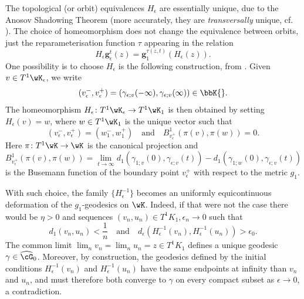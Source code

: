 \documentclass[reqno,11pt]{amsart}
\begin{document}
    \begin{remark}\label{rem:anosov_top_equivalences}
        The topological (or orbit) equivalences \(H_{\epsilon}\) are essentially unique, due to the Anosov Shadowing Theorem (more accurately, they are \emph{transversally} unique, cf. \cite[Theorem 5.4.1]{fisher2019hyperbolic}).
        The choice of homeomorphism does not change the equivalence between orbits, just the reparameterisation function \(\tau\) appearing in the relation
        \[
            H_\epsilon \mathbf{g}_\epsilon^t(z) = \mathbf{g}_1^{\tau(z, t)}(H_\epsilon(z)).
        \]
        One possibility is to choose \(H_\epsilon\) is the following construction, from \cite[Appendix B, Theorem B.1]{guillarmou_geodesic_2022}.
        Given \(v \in T^1\wK_\epsilon\), we write 
        \[
            (v^-_\epsilon, v^+_\epsilon) = (\gamma_{\epsilon; v}(-\infty), \gamma_{\epsilon; v}(\infty)) \in \bbK{}. 
        \]
        The homeomorphism \(H_\epsilon\colon T^1\wK_\epsilon \to T^1\wK_1\) is then obtained by setting \(H_\epsilon(v) = w\), where \(w \in T^1\wK_1\) is the unique vector such that
        \[
        (v^-_\epsilon, v^+_\epsilon) = (w^-_1, w^+_1) \quad \text{and} \quad B^1_{v^+_\epsilon}(\pi(v), \pi(w)) = 0.        
        \]
        Here \(\pi\colon T^1\wK \to \wK\) is the canonical projection and 
        \[
            B^1_{v^+_\epsilon}(\pi(v), \pi(w)) = \lim_{t \to \infty} d_1(\gamma_{1;v}(0), \gamma_{\epsilon;v}(t))-d_1(\gamma_{1;w}(0), \gamma_{\epsilon;v}(t))
        \]
        is the Busemann function of the boundary point \(v^+_\epsilon\) with respect to the metric \(g_1\).
        \par With such choice, the family \(\{H_\epsilon^{-1}\}\) becomes an uniformly equicontinuous deformation of the \(g_1\)-geodesics on \(\wK\).
        Indeed, if that were not the case there would be \(\eta> 0\) and sequences \((v_n, u_n) \in T^1K_1, \epsilon_n \to 0\) such that
        \[
            d_1(v_n, u_n) < \frac{1}{n} \quad \text{and} \quad d_\epsilon(H_\epsilon^{-1}(v_n), H_\epsilon^{-1}(u_n)) > \epsilon_0.
        \]
        The common limit \(\lim_n v_n = \lim_nu_n = z \in T^1K_1\) defines a unique geodesic \(\gamma \in \widehat{\cG}_0\).
        Moreover, by construction, the geodesics defined by the initial conditions \(H_\epsilon^{-1}(v_n)\) and \(  H_\epsilon^{-1}(u_n)\) have the same endpoints at infinity than \(v_n\) and \(u_n\), and must therefore both converge to \(\gamma\) on every compact subset as \(\epsilon \to 0\), a contradiction.
    \end{remark}
\end{document}
